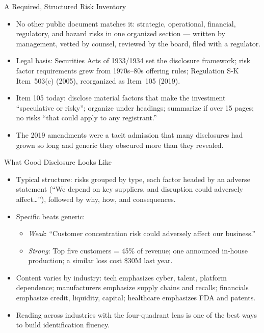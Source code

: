 \documentclass[11pt, aspectratio=169]{beamer}
\begin{document}
\begin{frame}{A Required, Structured Risk Inventory}
\begin{itemize}
  \item No other public document matches it: strategic, operational, financial, regulatory, and hazard risks in one organized section --- written by management, vetted by counsel, reviewed by the board, filed with a regulator.
  \item Legal basis: Securities Acts of 1933/1934 set the disclosure framework; risk factor requirements grew from 1970s--80s offering rules; Regulation S-K Item~503(c) (2005), reorganized as \alert{Item~105} (2019).
  \item Item 105 today: disclose \alert{material} factors that make the investment ``speculative or risky''; organize under headings; summarize if over 15 pages; no risks ``that could apply to any registrant.''
  \item The 2019 amendments were a tacit admission that many disclosures had grown so long and generic they obscured more than they revealed.
\end{itemize}
\end{frame}

\begin{frame}{What Good Disclosure Looks Like}
\begin{itemize}
  \item Typical structure: risks grouped by type, each factor headed by an adverse statement (``We depend on key suppliers, and disruption could adversely affect\ldots''), followed by why, how, and consequences.
  \item Specific beats generic:
  \begin{itemize}
    \item \emph{Weak}: ``Customer concentration risk could adversely affect our business.''
    \item \emph{Strong}: Top five customers = 45\% of revenue; one announced in-house production; a similar loss cost \$30M last year.
  \end{itemize}
  \item Content varies by industry: tech emphasizes cyber, talent, platform dependence; manufacturers emphasize supply chains and recalls; financials emphasize credit, liquidity, capital; healthcare emphasizes FDA and patents.
  \item Reading across industries with the \alert{four-quadrant lens} is one of the best ways to build identification fluency.
\end{itemize}
\end{frame}
\end{document}
